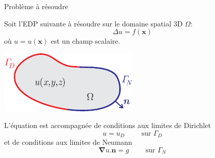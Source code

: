 \documentclass[
mode=present,    %
paper=a4paper,   %
orient=landscape,
display=slides,   %
size=10pt,     %
style=romain   %
]{powerdot}
\begin{document}
\begin{slide}{Problème à résoudre}

Soit l'EDP suivante à résoudre sur le domaine spatial 3D $\Omega$:
\begin{equation*}
    \Delta u = f(\boldsymbol{x})
\end{equation*}
où $u=u(\boldsymbol{x})$ est un champ scalaire.

\begin{center}
    \includegraphics[width=0.5\textwidth]{dom.eps}
\end{center}

L'équation est accompagnée de conditions aux limites de Dirichlet
\begin{equation*}
    u = u_D \qquad \text{ sur } \Gamma_D
\end{equation*}
et de conditions aux limites de Neumann
\begin{equation*}
    \boldsymbol{\nabla} u . \boldsymbol{n} = g \qquad \text{ sur } \Gamma_N
\end{equation*}

\end{slide}
\end{document}
